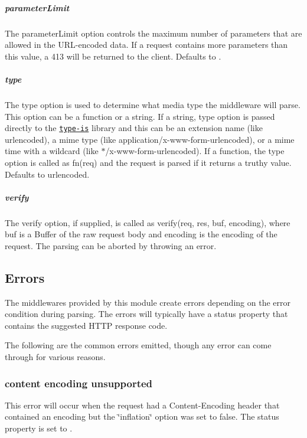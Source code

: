 \subparagraph*{parameter\+Limit}

The {\ttfamily parameter\+Limit} option controls the maximum number of parameters that are allowed in the U\+R\+L-\/encoded data. If a request contains more parameters than this value, a 413 will be returned to the client. Defaults to {}.

\subparagraph*{type}

The {\ttfamily type} option is used to determine what media type the middleware will parse. This option can be a function or a string. If a string, {\ttfamily type} option is passed directly to the \href{https://www.npmjs.org/package/type-is#readme}{\tt type-\/is} library and this can be an extension name (like {\ttfamily urlencoded}), a mime type (like {\ttfamily application/x-\/www-\/form-\/urlencoded}), or a mime time with a wildcard (like {\ttfamily $\ast$/x-\/www-\/form-\/urlencoded}). If a function, the {\ttfamily type} option is called as {\ttfamily fn(req)} and the request is parsed if it returns a truthy value. Defaults to {\ttfamily urlencoded}.

\subparagraph*{verify}

The {\ttfamily verify} option, if supplied, is called as {\ttfamily verify(req, res, buf, encoding)}, where {\ttfamily buf} is a {\ttfamily Buffer} of the raw request body and {\ttfamily encoding} is the encoding of the request. The parsing can be aborted by throwing an error.

\subsection*{Errors}

The middlewares provided by this module create errors depending on the error condition during parsing. The errors will typically have a {\ttfamily status} property that contains the suggested H\+T\+T\+P response code.

The following are the common errors emitted, though any error can come through for various reasons.

\subsubsection*{content encoding unsupported}

This error will occur when the request had a {\ttfamily Content-\/\+Encoding} header that contained an encoding but the \char`\"{}inflation\char`\"{} option was set to {\ttfamily false}. The {\ttfamily status} property is set to {}.

